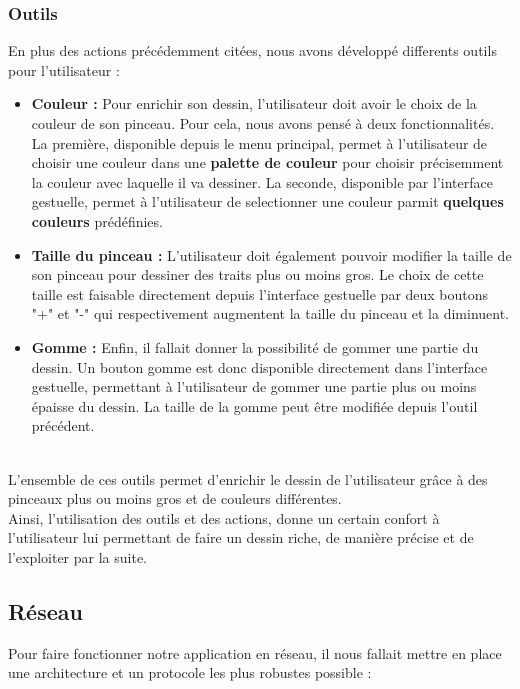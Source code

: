 \documentclass{report}
\begin{document}
			\subsubsection{Outils}
				En plus des actions précédemment citées, nous avons développé differents outils pour l'utilisateur : \\
				\begin{itemize}
					\item \textbf{Couleur :} Pour enrichir son dessin, l'utilisateur doit avoir le choix de la couleur de son pinceau. Pour cela, nous avons pensé à deux fonctionnalités. La première, disponible depuis le menu principal, permet à l'utilisateur de choisir une couleur dans une \textbf{palette de couleur} pour choisir précisemment la couleur avec laquelle il va dessiner. La seconde, disponible par l'interface gestuelle, permet à l'utilisateur de selectionner une couleur parmit \textbf{quelques couleurs} prédéfinies. 
					\item \textbf{Taille du pinceau :} L'utilisateur doit également pouvoir modifier la taille de son pinceau pour dessiner des traits plus ou moins gros. Le choix de cette taille est faisable directement depuis l'interface gestuelle par deux boutons "+" et "-" qui respectivement augmentent la taille du pinceau et la diminuent.
					\item \textbf{Gomme :} Enfin, il fallait donner la possibilité de gommer une partie du dessin. Un bouton gomme est donc disponible directement dans l'interface gestuelle, permettant à l'utilisateur de gommer une partie plus ou moins épaisse du dessin. La taille de la gomme peut être modifiée depuis l'outil précédent.
				\end{itemize} \ \\
				
				L'ensemble de ces outils permet d'enrichir le dessin de l'utilisateur grâce à des pinceaux plus ou moins gros et de couleurs différentes. \\
				Ainsi, l'utilisation des outils et des actions, donne un certain confort à l'utilisateur lui permettant de faire un dessin riche, de manière précise et de l'exploiter par la suite.
		\subsection{Réseau}
			Pour faire fonctionner notre application en réseau, il nous fallait mettre en place une architecture et un protocole les plus robustes possible :
\end{document}
